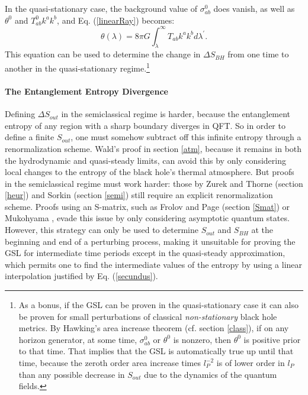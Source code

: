\documentclass[12pt]{article}
\begin{document}
In the quasi-stationary case, the background value of $\sigma_{ab}^{0}$ does vanish, as well as $\theta^{0}$ and $T_{ab}^{0} k^a k^b$, and Eq. (\ref{linearRay}) becomes:
\begin{equation}\label{response}
\theta(\lambda) = 8\pi G \int^{\infty}_{\lambda} \!\! T_{ab} k^a k^b d\lambda^{\prime}.
\end{equation}
This equation can be used to determine the change in $\Delta S_{BH}$ from one time to another in the quasi-stationary regime.\footnote{As a bonus, if the GSL can be proven in the quasi-stationary case it can also be proven for small perturbations of classical \emph{non-stationary} black hole metrics.  By Hawking's area increase theorem (cf. section \ref{class}), if on any horizon generator, at some time, $\sigma_{ab}^{0}$ or $\theta^{0}$ is nonzero, then $\theta^{0}$ is positive prior to that time.  That implies that the GSL is automatically true up until that time, because the zeroth order area increase times $l_{P}^{-2}$ is of lower order in $l_{P}$ than any possible decrease in $S_{out}$ due to the dynamics of the quantum fields.}
\paragraph{The Entanglement Entropy Divergence}
Defining $\Delta S_{out}$ in the semiclassical regime is harder, because the entanglement entropy of any region with a sharp boundary diverges in QFT.  So in order to define a finite $S_{out}$, one must somehow subtract off this infinite entropy through a renormalization scheme.  Wald's proof in section \ref{atm}, because it remains in both the hydrodynamic and quasi-steady limits, can avoid this by only considering local changes to the entropy of the black hole's thermal atmosphere.  But proofs in the semiclassical regime must work harder: those by Zurek and Thorne \cite{ZT85} (section \ref{heur}) and Sorkin \cite{sorkin98} (section \ref{semi}) still require an explicit renormalization scheme.  Proofs using an S-matrix, such as Frolov and Page \cite{FP93} (section \ref{Smat}) or Mukohyama \cite{muko97}, evade this issue by only considering asymptotic quantum states.  However, this strategy can only be used to determine $S_{out}$ and $S_{BH}$ at the beginning and end of a perturbing process, making it unsuitable for proving the GSL for intermediate time periods except in the quasi-steady approximation, which permits one to find the intermediate values of the entropy by using a linear interpolation justified by Eq. (\ref{secundus}).
\end{document}
